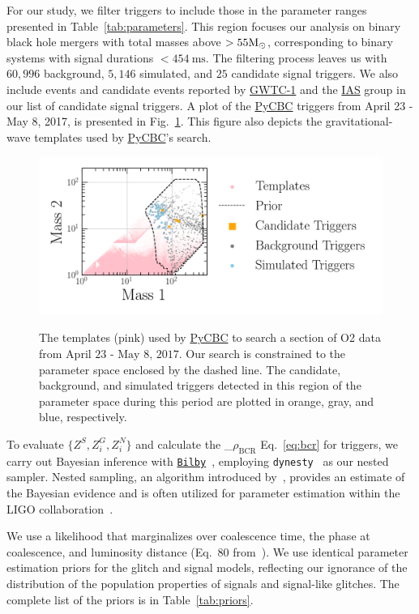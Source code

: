 \documentclass[%
 nofootinbib,
 amsmath,amssymb,
 aps,
 twocolumn,
 superscriptaddress
]{revtex4-2}
\newcommand{\bilby}{{\sc \href{https://lscsoft.docs.ligo.org/bilby/}{\texttt{Bilby}}}\xspace}
\newcommand{\dynesty}{{\sc \texttt{dynesty}}\xspace}
\newcommand{\pycbc}{{\sc \href{https://pycbc.org/}{{PyCBC}}}\xspace}
\newcommand{\GWTC}{{\sc \href{https://ui.adsabs.harvard.edu/abs/2019PhRvX...9c1040A/abstract}{{GWTC-1}}}\xspace}
\newcommand{\IAS}{{\sc \href{https://ui.adsabs.harvard.edu/abs/2020PhRvD.101h3030V/abstract}{{IAS}}}\xspace}
\newcommand{\mathcmd}[1]{{\sc \relax\ifmmode#1\else $#1$\fi}\xspace}
\newcommand{\bcr}{\mathcmd{\rho_\text{BCR}}}
\newcommand{\msun}{\mathcmd{\text{M}_\odot}}
\begin{document}
For our study, we filter triggers to include those in the parameter ranges presented in Table~\ref{tab:parameters}. This region focuses our analysis on binary black hole mergers with total masses above $> 55 \msun$, corresponding to binary systems with signal durations $<454 \ \text{ms}$. The filtering process leaves us with $60,996$ background, $5,146$ simulated, and $25$ candidate signal triggers. We also include events and candidate events reported by \GWTC and the \IAS group in our list of candidate signal triggers.  A plot of the \pycbc triggers from April 23 - May 8, 2017, is presented in Fig.~\ref{fig:templateBank}. This figure also depicts the gravitational-wave templates used by \pycbc's search. 

\begin{figure}[!ht]
{\centering \includegraphics[width=0.75\linewidth]{images/template_bank.png}
}
\caption[ BCR search space.]{The templates (pink) used by \pycbc to search a section of O2 data from $\text{April 23 - May 8, 2017}$. Our search is constrained to the parameter space enclosed by the dashed line. The candidate, background, and simulated triggers detected in this region of the parameter space during this period are plotted in orange, gray, and blue, respectively.}\label{fig:templateBank}
\end{figure}





To evaluate $\{Z^S, Z^G_i, Z^N_i\}$ and calculate the \bcr Eq.~\ref{eq:bcr} for triggers, we carry out Bayesian inference with \bilby~\cite{bilby, bilby_pipe}, employing \dynesty~\cite{dynesty} as our nested sampler. Nested sampling, an algorithm introduced by~\citet{skilling2004, skilling2006}, provides an estimate of the Bayesian evidence and is often utilized for parameter estimation within the LIGO collaboration~\cite{bilby, bilby_paper, pbilby_paper}.

We use a likelihood that marginalizes over coalescence time, the phase at coalescence, and luminosity distance (Eq.~80 from~\citet{intro_to_gw_bayes}). We use identical parameter estimation priors for the glitch and signal models, reflecting our ignorance of the distribution of the population properties of signals and signal-like glitches. The complete list of the priors is in Table~\ref{tab:priors}. 
\end{document}
